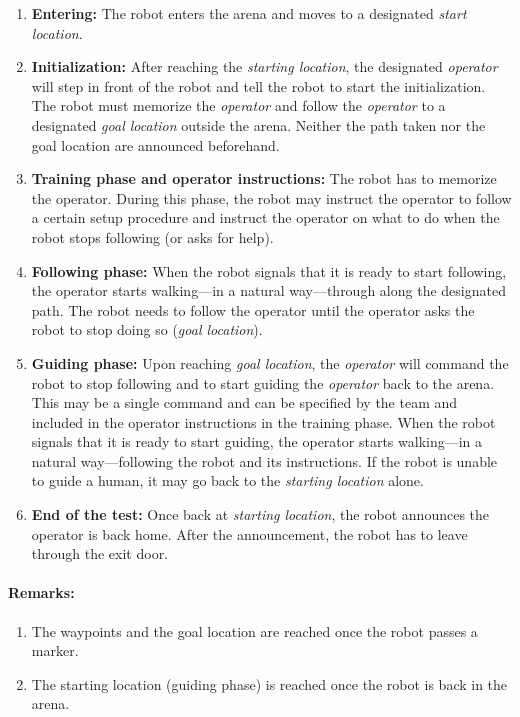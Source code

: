 \begin{enumerate}
\item \textbf{Entering:} The robot enters the arena and moves to a designated \emph{start location}.
\item \textbf{Initialization:} After reaching the \emph{starting location}, the designated \textit{operator} will step in front of the robot and tell the robot to start the initialization. 
  The robot must memorize the \textit{operator} and follow the \emph{operator} to a designated \emph{goal location} outside the arena. 
  Neither the path taken nor the goal location are announced beforehand.
\item \textbf{Training phase and operator instructions:} The robot has to memorize the operator. 
  During this phase, the robot may instruct the operator to follow a certain setup procedure and instruct the operator on what to do when the robot stops following (or asks for help).
\item \textbf{Following phase:} When the robot signals that it is ready to start following, the operator starts walking---in a natural way---through along the designated path. 
  The robot needs to follow the operator until the operator asks the robot to stop doing so (\textit{goal location}).
\item \textbf{Guiding phase:} Upon reaching \textit{goal location}, the \textit{operator} will command the robot to stop following and to start guiding the \emph{operator} back to the arena.
  This may be a single command and can be specified by the team and included in the operator instructions in the training phase.
  When the robot signals that it is ready to start guiding, the operator starts walking---in a natural way---following the robot and its instructions.
  If the robot is unable to guide a human, it may go back to the \textit{starting location} alone.
\item \textbf{End of the test:} Once back at \textit{starting location}, the robot announces the operator is back home. 
  After the announcement, the robot has to leave through the exit door.
\end{enumerate}

\paragraph*{Remarks:}
\begin{enumerate}
\item The waypoints and the goal location are reached once the robot passes a marker.
\item The starting location (guiding phase) is reached once the robot is back in the arena.
\end{enumerate}

